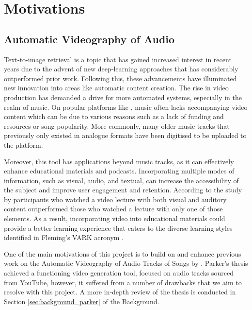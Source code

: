 \documentclass{l4proj}
\begin{document}
\section{Motivations}
\subsection{Automatic Videography of Audio}
Text-to-image retrieval is a topic that has gained increased interest in recent years due to the advent of new deep-learning approaches that has considerably outperformed prior work. Following this, these advancements have illuminated new innovation into areas like automatic content creation. The rise in video production \citep{tprisevideo} has demanded a drive for more automated systems, especially in the realm of music. On popular platforms like \cite{youtube}, music often lacks accompanying video content which can be due to various reasons such as a lack of funding and resources or song popularity. More commonly, many older music tracks that previously only existed in analogue formats have been digitised to be uploaded to the platform.

Moreover, this tool has applications beyond music tracks, as it can effectively enhance educational materials and podcasts. Incorporating multiple modes of information, such as visual, audio, and textual, can increase the accessibility of the subject and improve user engagement and retention. According to the study by \citep{benefits_of_mmv} participants who watched a video lecture with both visual and auditory content outperformed those who watched a lecture with only one of those elements. As a result, incorporating video into educational materials could provide a better learning experience that caters to the diverse learning styles identified in Fleming's VARK acronym \citep{vark}.

One of the main motivations of this project is to build on and enhance previous work on the Automatic Videography of Audio Tracks of Songs by \cite{parker}. Parker's thesis achieved a functioning video generation tool, focused on audio tracks sourced from YouTube, however, it suffered from a number of drawbacks that we aim to resolve with this project. A more in-depth review of the thesis is conducted in Section \ref{sec:background_parker} of the Background.
\end{document}

